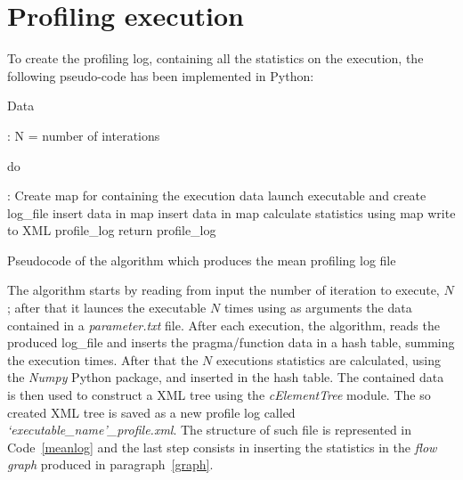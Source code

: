 \documentclass[a4paper,12pt,oneside]{book}
\begin{document}
\section{Profiling execution}

To create the profiling log, containing all the statistics on the execution, the following pseudo-code has been implemented in Python:

\begin{algorithm}[H]
\begin{algorithmic}
 \State \begin{bf}Data\end{bf}:{ N = number of interations}
\State \begin{bf}do\end{bf}: Create map for containing the execution data
\State launch executable and create log\_file
\State insert data in map
\EndFor
{}
\State insert data in map
\EndFor
\EndFor
\State calculate statistics using map\;
\State write to XML profile\_log
\EndFor
\State return profile\_log
\end{algorithmic}
\caption{Pseudocode of the algorithm which produces the mean profiling log file}
\end{algorithm}

The algorithm starts by reading from input the number of iteration to execute, $N$; after that it launces the executable $N$ times using as arguments the data contained in a \emph{parameter.txt} file. After each execution, the algorithm, reads the produced log\_file and inserts the pragma/function data in a hash table, summing the execution times. After that the $N$ executions statistics are calculated, using the \emph{Numpy} Python package, and inserted in the hash table. The contained data is then used to construct a XML tree using the \emph{cElementTree} module. The so created XML tree is saved as a new profile log called \emph{`executable\_name'\_profile.xml}. The structure of such file is represented in Code~\ref{meanlog} and the last step consists in inserting the statistics in the \emph{flow graph} produced in paragraph~\ref{graph}.
\end{document}
